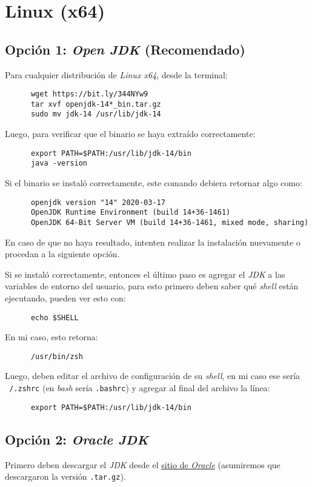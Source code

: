 \section{Linux (x64)}
  \subsection{Opción 1: \textit{Open JDK} (Recomendado)}
    Para cualquier distribución de \textit{Linux x64}, desde la terminal:

    \begin{verbatim}
      wget https://bit.ly/344NYw9
      tar xvf openjdk-14*_bin.tar.gz
      sudo mv jdk-14 /usr/lib/jdk-14
    \end{verbatim}

    Luego, para verificar que el binario se haya extraído correctamente:

    \begin{verbatim}
      export PATH=$PATH:/usr/lib/jdk-14/bin
      java -version
    \end{verbatim}

    Si el binario se instaló correctamente, este comando debiera retornar algo como:

    \begin{verbatim}
      openjdk version "14" 2020-03-17
      OpenJDK Runtime Environment (build 14+36-1461)
      OpenJDK 64-Bit Server VM (build 14+36-1461, mixed mode, sharing)
    \end{verbatim}

    En caso de que no haya resultado, intenten realizar la instalación nuevamente o 
    procedan a la siguiente opción.

    Si se instaló correctamente, entonces el último paso es agregar el \textit{JDK} a 
    las variables de entorno del usuario, para esto primero deben saber qué 
    \textit{shell} están ejecutando, pueden ver esto con:

    \begin{verbatim}
      echo $SHELL
    \end{verbatim}

    En mi caso, esto retorna:

    \begin{verbatim}
      /usr/bin/zsh
    \end{verbatim}

    Luego, deben editar el archivo de configuración de su \textit{shell}, en mi caso ese
    sería \texttt{~/.zshrc} (en \textit{bash} sería \texttt{.bashrc}) y 
    agregar al final del archivo la línea:
    
    \begin{verbatim}
      export PATH=$PATH:/usr/lib/jdk-14/bin
    \end{verbatim}

  \subsection{Opción 2: \textit{Oracle JDK}}
    Primero deben descargar el \textit{JDK} desde el
    \href{https://www.oracle.com/java/technologies/javase-jdk14-downloads.html}{sitio de 
    \textit{Oracle}} (asumiremos que descargaron la versión \texttt{.tar.gz}).
%